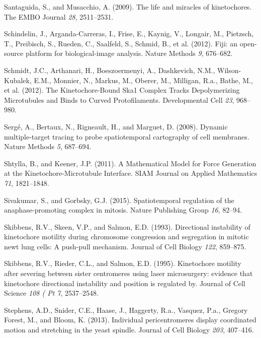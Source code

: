 \documentclass[12pt,a4paper,twoside,openright]{book}
\begin{document}
Santaguida, S., and Musacchio, A. (2009). The life and miracles of
kinetochores. The EMBO Journal \emph{28}, 2511--2531.

Schindelin, J., Arganda-Carreras, I., Frise, E., Kaynig, V., Longair,
M., Pietzsch, T., Preibisch, S., Rueden, C., Saalfeld, S., Schmid, B.,
et al. (2012). Fiji: an open-source platform for biological-image
analysis. Nature Methods \emph{9}, 676--682.

Schmidt, J.C., Arthanari, H., Boeszoermenyi, A., Dashkevich, N.M.,
Wilson-Kubalek, E.M., Monnier, N., Markus, M., Oberer, M., Milligan,
R.a., Bathe, M., et al. (2012). The Kinetochore-Bound Ska1 Complex
Tracks Depolymerizing Microtubules and Binds to Curved Protofilaments.
Developmental Cell \emph{23}, 968--980.

Sergé, A., Bertaux, N., Rigneault, H., and Marguet, D. (2008). Dynamic
multiple-target tracing to probe spatiotemporal cartography of cell
membranes. Nature Methods \emph{5}, 687--694.

Shtylla, B., and Keener, J.P. (2011). A Mathematical Model for Force
Generation at the Kinetochore-Microtubule Interface. SIAM Journal on
Applied Mathematics \emph{71}, 1821--1848.

Sivakumar, S., and Gorbsky, G.J. (2015). Spatiotemporal regulation of
the anaphase-promoting complex in mitosis. Nature Publishing Group
\emph{16}, 82--94.

Skibbens, R.V., Skeen, V.P., and Salmon, E.D. (1993). Directional
instability of kinetochore motility during chromosome congression and
segregation in mitotic newt lung cells: A push-pull mechanism. Journal
of Cell Biology \emph{122}, 859--875.

Skibbens, R.V., Rieder, C.L., and Salmon, E.D. (1995). Kinetochore
motility after severing between sister centromeres using laser
microsurgery: evidence that kinetochore directional instability and
position is regulated by. Journal of Cell Science \emph{108 ( Pt 7},
2537--2548.

Stephens, A.D., Snider, C.E., Haase, J., Haggerty, R.a., Vasquez, P.a.,
Gregory Forest, M., and Bloom, K. (2013). Individual pericentromeres
display coordinated motion and stretching in the yeast spindle. Journal
of Cell Biology \emph{203}, 407--416.
\end{document}
